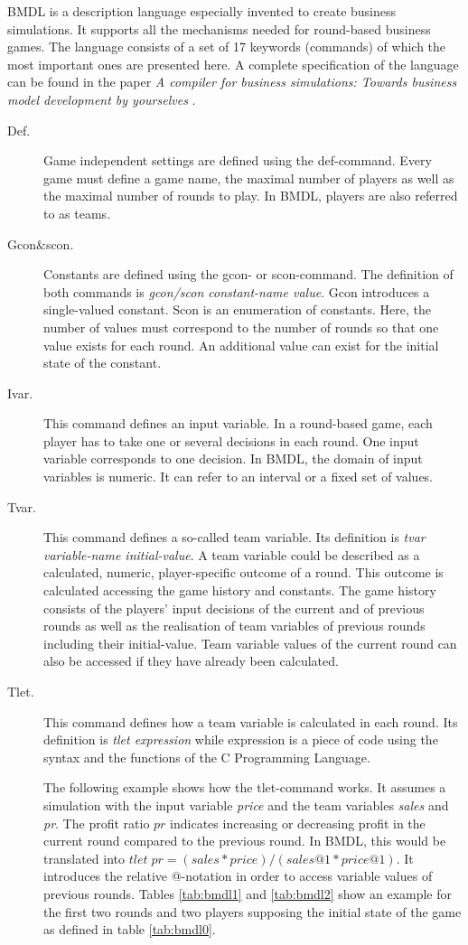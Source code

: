 BMDL is a description language especially invented to create business simulations. It supports all the mechanisms needed for round-based business games. The language consists of a set of 17 keywords (commands) of which the most important ones are presented here. A complete specification of the language can be found in the paper \textit{A compiler for business simulations: Towards business model development by yourselves} \cite{bmdl1}.

\begin{description}
\item[Def.] Game independent settings are  defined using the def-command. Every game must define a game name, the maximal number of players as well as the maximal number of rounds to play. In BMDL, players are also referred to as teams.
\item[Gcon\&scon.] Constants are defined using the gcon- or scon-command. The definition of both commands is \textit{gcon/scon constant-name value}. Gcon introduces a single-valued constant. Scon is an enumeration of constants. Here, the number of values must correspond to the number of rounds so that one value exists for each round. An additional value can exist for the initial state of the constant.
\item[Ivar.] This command defines an input variable. In a round-based game, each player has to take one or several decisions in each round. One input variable corresponds to one decision. In BMDL, the domain of input variables is numeric. It can refer to an interval or a fixed set of values.
\item[Tvar.] This command defines a so-called team variable. Its definition is \textit{tvar variable-name initial-value}. A team variable could be described as a calculated, numeric, player-specific outcome of a round. This outcome is calculated accessing the game history and constants. The game history consists of the players' input decisions of the current and of previous rounds as well as the realisation of team variables of previous rounds including their initial-value. Team variable values of the current round can also be accessed if they have already been calculated.
\item[Tlet.] This command defines how a team variable is calculated in each round. Its definition is \textit{tlet expression} while expression is a piece of code using the syntax and the functions of the C Programming Language. 

The following example shows how the tlet-command works. It assumes a simulation with the input variable \textit{price} and the team variables \textit{sales} and \textit{pr}. The profit ratio $pr$ indicates increasing or decreasing profit in the current round compared to the previous round. In BMDL, this would be translated into $tlet \; pr=(sales*price)/(sales@1*price@1)$. It introduces the relative @-notation in order to access variable values of previous rounds. Tables \ref{tab:bmdl1} and \ref{tab:bmdl2} show an example for the first two rounds and two players supposing the initial state of the game as defined in table \ref{tab:bmdl0}.


\end{description}
